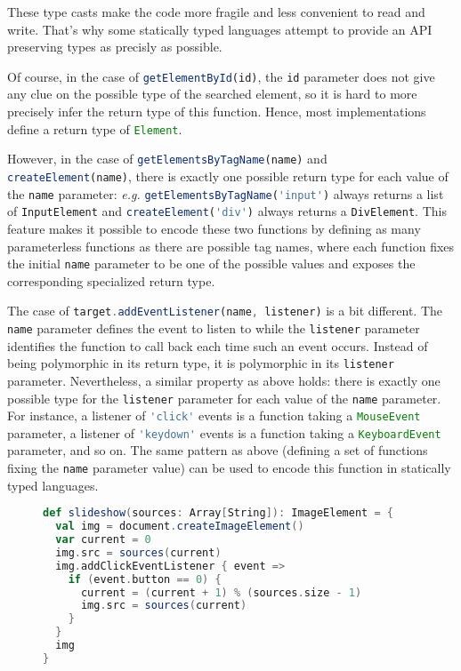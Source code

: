 \documentclass{llncs}
\newcommand{\jscode}[1]{\lstinline[language=JavaScript]|#1|}
\begin{document}
These type casts make the code more fragile and less convenient to read and write. That's why some statically typed languages attempt to provide an API preserving types as precisly as possible.

Of course, in the case of \jscode{getElementById(id)}, the \jscode{id} parameter does not give any clue on the possible type of the searched element, so it is hard to more precisely infer the return type of this function. Hence, most implementations define a return type of \jscode{Element}.

However, in the case of \jscode{getElementsByTagName(name)} and \jscode{createElement(name)}, there is exactly one possible return type for each value of the \jscode{name} parameter: \emph{e.g.} \jscode{getElementsByTagName('input')} always returns a list of \jscode{InputElement} and \jscode{createElement('div')} always returns a \jscode{DivElement}. This feature makes it possible to encode these two functions by defining as many parameterless functions as there are possible tag names, where each function fixes the initial \jscode{name} parameter to be one of the possible values and exposes the corresponding specialized return type.

The case of \jscode{target.addEventListener(name, listener)} is a bit different. The \jscode{name} parameter defines the event to listen to while the \jscode{listener} parameter identifies the function to call back each time such an event occurs. Instead of being polymorphic in its return type, it is polymorphic in its \jscode{listener} parameter. Nevertheless, a similar property as above holds: there is exactly one possible type for the \jscode{listener} parameter for each value of the \jscode{name} parameter. For instance, a listener of \jscode{'click'} events is a function taking a \jscode{MouseEvent} parameter, a listener of \jscode{'keydown'} events is a function taking a \jscode{KeyboardEvent} parameter, and so on. The same pattern as above (defining a set of functions fixing the \jscode{name} parameter value) can be used to encode this function in statically typed languages.

\begin{figure}
\begin{lstlisting}[label=lst-problem-comb,language=Scala,caption={Scala implementation of \texttt{slideshow} using specialized functions}]
def slideshow(sources: Array[String]): ImageElement = {
  val img = document.createImageElement()
  var current = 0
  img.src = sources(current)
  img.addClickEventListener { event =>
    if (event.button == 0) {
      current = (current + 1) % (sources.size - 1)
      img.src = sources(current)
    }
  }
  img
}
\end{lstlisting}
\end{figure}
\end{document}

